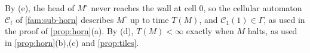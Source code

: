 By (e), the head of $M^\circ$ never reaches the wall at cell $0$, so the cellular automaton $\mathcal C_t$ of \cref{fam:sub-horn} describes $M^\circ$ up to time $T(M)$, and $\mathcal C_1(1)\in\Gamma$, as used in the proof of \cref{prop:horn}(a). By (d), $T(M)<\infty$ exactly when $M$ halts, as used in \cref{prop:horn}(b),(c) and \cref{prop:tiles}.
